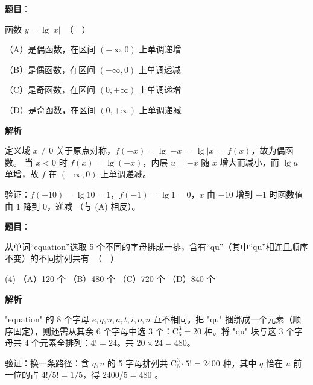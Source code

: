 \begin{answer}

\textbf{题目}：

函数 $y = \lg |x|$　（　）

（A）是偶函数，在区间 $(-\infty, 0)$ 上单调递增

（B）是偶函数，在区间 $(-\infty, 0)$ 上单调递减

（C）是奇函数，在区间 $(0, +\infty)$ 上单调递增

（D）是奇函数，在区间 $(0, +\infty)$ 上单调递减

\textbf{解析}

定义域 $x\ne0$ 关于原点对称，$f(-x)=\lg|-x|=\lg|x|=f(x)$，故为偶函数。
当 $x<0$ 时 $f(x)=\lg(-x)$，内层 $u=-x$ 随 $x$ 增大而减小，而 $\lg u$ 单增，故 $f$ 在 $(-\infty,0)$ 上单调递减。

验证：$f(-10)=\lg10=1$，$f(-1)=\lg1=0$，$x$ 由 $-10$ 增到 $-1$ 时函数值由 $1$ 降到 $0$，递减 （与 (A) 相反）。


\end{answer}
\begin{answer}

\textbf{题目}：

从单词“equation”选取 5 个不同的字母排成一排，含有“qu”（其中“qu”相连且顺序不变）的不同排列共有　（　）

\begin{gkopts}(4)
\task （A）120 个
\task （B）480 个
\task （C）720 个
\task （D）840 个
\end{gkopts}

\textbf{解析}

"equation" 的 8 个字母 $e,q,u,a,t,i,o,n$ 互不相同。把 "qu" 捆绑成一个元素（顺序固定），则还需从其余 6 个字母中选 3 个：$\mathrm C_6^3=20$ 种。将 "qu" 块与这 3 个字母共 4 个元素全排列：$4!=24$。共 $20\times24=480$。

验证：换一条路径：含 $q,u$ 的 5 字母排列共 $\mathrm C_6^3\cdot5!=2400$ 种，其中 $q$ 恰在 $u$ 前一位的占 $4!/5!=1/5$，得 $2400/5=480$ 。


\end{answer}
